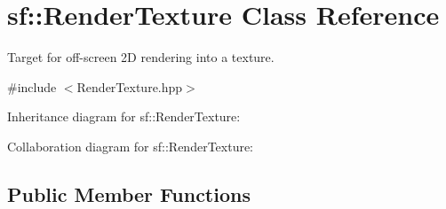 \hypertarget{classsf_1_1_render_texture}{}\section{sf\+:\+:Render\+Texture Class Reference}
\label{classsf_1_1_render_texture}


Target for off-\/screen 2D rendering into a texture.  




{\ttfamily \#include $<$Render\+Texture.\+hpp$>$}



Inheritance diagram for sf\+:\+:Render\+Texture\+:


Collaboration diagram for sf\+:\+:Render\+Texture\+:
\subsection*{Public Member Functions}
